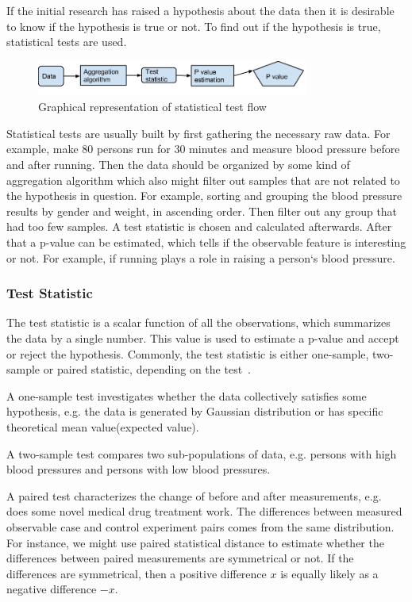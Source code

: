 \documentclass[12pt]{article}
\begin{document}
{If the initial research has raised a hypothesis about the data then it is desirable to know if the hypothesis is true or not. To find out if the hypothesis is true, statistical tests are used.

\begin{figure}[H]
  \centering
  \includegraphics[width=0.8\textwidth]{statisticalTestFlow}
  \caption{Graphical representation of statistical test flow}
  \label{fig:statisticalTestFlow}
\end{figure}

Statistical tests are usually built by first gathering the necessary raw data. For example, make 80 persons run for 30 minutes and measure blood pressure before and after running. Then the data should be organized by some kind of aggregation algorithm which also might filter out samples that are not related to the hypothesis in question. For example, sorting and grouping the blood pressure results by gender and weight, in ascending order. Then filter out any group that had too few samples. A test statistic is chosen and calculated afterwards. After that a p-value can be estimated, which tells if the observable feature is interesting or not. For example, if running plays a role in raising a person`s blood pressure.

\subsubsection{Test Statistic}

The test statistic is a scalar function of all the observations, which summarizes the data by a single number. This value is used to estimate a p-value and accept or reject the hypothesis. Commonly, the test statistic is either one-sample, two-sample or paired statistic, depending on the test~\cite{test_statistic}.

A one-sample test investigates whether the data collectively satisfies some hypothesis, e.g. the data is generated by Gaussian distribution or has specific theoretical mean value(expected value).

A two-sample test compares two sub-populations of data, e.g. persons with high blood pressures and persons with low blood pressures.

A paired test characterizes the change of before and after measurements, e.g. does some novel medical drug treatment work. The differences between measured observable case and control experiment pairs comes from the same distribution. For instance, we might use paired statistical distance to estimate whether the differences between paired measurements are symmetrical or not. If the differences are symmetrical, then a positive difference $x$ is equally likely as a negative difference $-x$.

}
\end{document}
